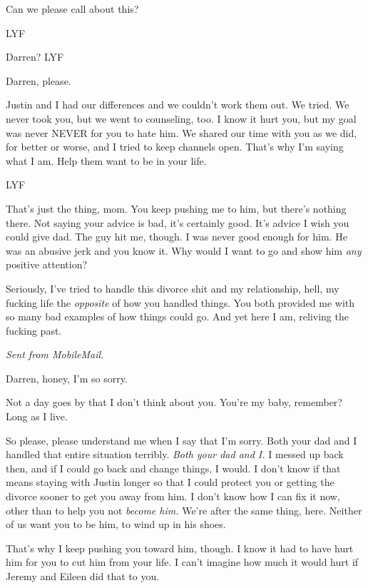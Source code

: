 Can we please call about this?

LYF

\secdiv{}

Darren? LYF

\secdiv{}

Darren, please.

Justin and I had our differences and we couldn't work them out. We tried. We never took you, but we went to counseling, too. I know it hurt you, but my goal was never NEVER for you to hate him. We shared our time with you as we did, for better or worse, and I tried to keep channels open. That's why I'm saying what I am. Help them want to be in your life.

LYF

\secdiv{}

That's just the thing, mom. You keep pushing me to him, but there's nothing there. Not saying your advice is bad, it's certainly good. It's advice I wish you could give dad. The guy hit me, though. I was never good enough for him. He was an abusive jerk and you know it. Why would I want to go and show him \emph{any} positive attention?

Seriously, I've tried to handle this divorce shit and my relationship, hell, my fucking life the \emph{opposite} of how you handled things. You both provided me with so many bad examples of how things could go. And yet here I am, reliving the fucking past.

\emph{Sent from MobileMail.}

\secdiv{}

Darren, honey, I'm so sorry.

Not a day goes by that I don't think about you. You're my baby, remember? Long as I live.

So please, please understand me when I say that I'm sorry. Both your dad and I handled that entire situation terribly. \emph{Both your dad and I.} I messed up back then, and if I could go back and change things, I would. I don't know if that means staying with Justin longer so that I could protect you or getting the divorce sooner to get you away from him. I don't know how I can fix it now, other than to help you not \emph{become him.} We're after the same thing, here. Neither of us want you to be him, to wind up in his shoes.

That's why I keep pushing you toward him, though. I know it had to have hurt him for you to cut him from your life. I can't imagine how much it would hurt if Jeremy and Eileen did that to you.

